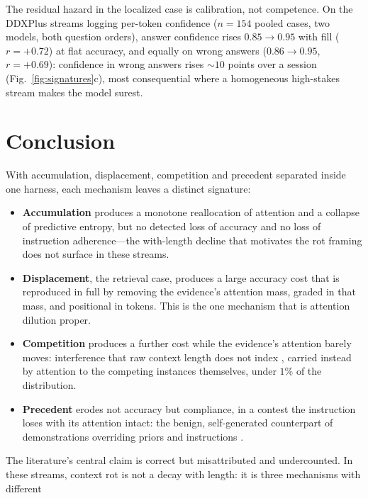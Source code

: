 \documentclass{article}
\begin{document}
The residual hazard in the localized case is calibration, not competence. On the DDXPlus
streams logging per-token confidence ($n{=}154$ pooled cases, two models, both question orders),
answer confidence rises $0.85\to0.95$ with fill ($r=+0.72$) at flat accuracy, and equally on
wrong answers ($0.86\to0.95$, $r=+0.69$): confidence in wrong answers rises ${\sim}10$
points over a session (Fig.~\ref{fig:signatures}c), most consequential where a homogeneous
high-stakes stream makes the model surest.

\section{Conclusion}

With accumulation, displacement, competition and precedent separated inside one harness, each
mechanism leaves a distinct signature:
\begin{itemize}[leftmargin=1.35em,itemsep=1pt,topsep=2pt]
\item \textbf{Accumulation} produces a monotone reallocation of attention and a collapse of
  predictive entropy, but no detected loss of accuracy and no loss of instruction
  adherence---the with-length decline that motivates the rot framing
  \citep{liu2023lost,hong2025contextrot,laban2025lost} does not surface in these streams.
\item \textbf{Displacement}, the retrieval case, produces a large accuracy cost that is
  reproduced in full by removing the evidence's attention mass, graded in that mass, and
  positional in tokens. This is the one mechanism that is attention dilution proper.
\item \textbf{Competition} produces a further cost while the evidence's attention barely
  moves: interference that raw context length does not index
  \citep[cf.][]{wang2025unabletoforget}, carried instead by attention to the competing
  instances themselves, under $1\%$ of the distribution.
\item \textbf{Precedent} erodes not accuracy but compliance, in a contest the
  instruction loses with its attention intact: the benign, self-generated counterpart
  of demonstrations overriding priors and instructions
  \citep{wei2023icldifferently,anil2024manyshot,camassa2026instructioninduction}.
\end{itemize}
The literature's central claim is correct but misattributed and undercounted. In
these streams, context rot is not a decay with length: it is three mechanisms with different
\end{document}
